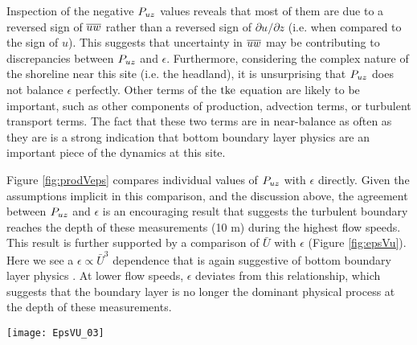 Inspection of the negative $P_{uz}$ values reveals that most of them are due to a reversed sign of $\overline{uw}$ rather than a reversed sign of $\partial u / \partial z$ (i.e. when compared to the sign of $u$). This suggests that uncertainty in $\overline{uw}$ may be contributing to discrepancies between $P_{uz}$ and $\epsilon$. Furthermore, considering the complex nature of the shoreline near this site (i.e. the headland), it is unsurprising that $P_{uz}$ does not balance $\epsilon$ perfectly. Other terms of the $\mathrm{tke}$ equation are likely to be important, such as other components of production, advection terms, or turbulent transport terms. The fact that these two terms are in near-balance as often as they are is a strong indication that bottom boundary layer physics are an important piece of the dynamics at this site.

Figure \ref{fig:prodVeps} compares individual values of $P_{uz}$ with $\epsilon$ directly. Given the assumptions implicit in this comparison, and the discussion above, the agreement between $P_{uz}$ and $\epsilon$ is an encouraging result that suggests the turbulent boundary reaches the depth of these measurements (10 m) during the highest flow speeds. This result is further supported by a comparison of $\bar{U}$ with $\epsilon$ (Figure \ref{fig:epsVu}). Here we see a $\epsilon \propto \bar{U}^3$ dependence that is again suggestive of bottom boundary layer physics \cite[]{Trowbridge1992,Nash++2009}. At lower flow speeds, $\epsilon$ deviates from this relationship, which suggests that the boundary layer is no longer the dominant physical process at the depth of these measurements.


\begin{figure*}[t]
  \centering
  \texttt{[image: EpsVU\_03]}
  \caption{A log-log plot of $\epsilon$ versus $\bar{U}$ for the June 2014 TTM (diamonds) and May 2015 StableMoor (dots) deployments, during ebb (left) and flood (right). Black points are 5 minute averages.  Green dots are mean values within speed bins of 0.2 m s$^{-1}$ width that have at least 10 points (50 minutes of data); their vertical bars are 95\% bootstrap confidence intervals. The blue line shows a $U^3$ slope, where the proportionality constant (blue box) is calculated by taking the log-space mean of $\epsilon/U^3$. }
  \label{fig:epsVu}
\end{figure*}



